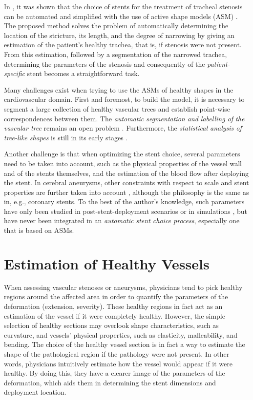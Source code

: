 In \citep{Pinho:Trachea4,Pinho:Thesis}, it was shown that the choice of stents for the treatment of tracheal stenosis can be automated and simplified with the use of active shape models (ASM) \citep{Cootes}. The proposed method solves the problem of automatically determining the location of the stricture, its length, and the degree of narrowing by giving an estimation of the patient's healthy trachea, that is, if stenosis were not present. From this estimation, followed by a segmentation of the narrowed trachea, determining the parameters of the stenosis and consequently of the {\em patient-specific} stent becomes a straightforward task. 

Many challenges exist when trying to use the ASMs of healthy shapes in the cardiovascular domain. First and foremost, to build the model, it is necessary to segment a large collection of healthy vascular trees and establish point-wise correspondences between them. The {\em automatic segmentation and labelling of the vascular tree} remains an open problem \citep{ORKI-08,Antiga,CARR-07,Scherl200721,Bemmel,Dikkers}. Furthermore, the {\em statistical analysis of tree-like shapes} is still in its early stages \citep{Feragen2011,Feragen2012}. 

Another challenge is that when optimizing the stent choice, several parameters need to be taken into account, such as the physical properties of the vessel wall and of the stents themselves, and the estimation of the blood flow after deploying the stent. In cerebral aneurysms, other constraints with respect to scale and stent properties are further taken into account \citep{larrabide:2439,Larrabide2010,bogunovic:210,zhang:1294}, although the philosophy is the same as in, e.g., coronary stents. To the best of the author's knowledge, such parameters have only been studied in post-stent-deployment scenarios or in simulations \citep{deBeule,Florez2,Gori,Vuk,FLOR-07b,Sforza}, but have never been integrated in an {\em automatic stent choice process}, especially one that is based on ASMs. 

\section{Estimation of Healthy Vessels}
\label{sec:healthyvessels}

\challenge
When assessing vascular stenoses or aneurysms, physicians tend to pick healthy regions around the affected area in order to quantify the parameters of the deformation (extension, severity). These healthy regions in fact act as an estimation of the vessel if it were completely healthy. However, the simple selection of healthy sections may overlook shape characteristics, such as curvature, and vessels' physical properties, such as elasticity, malleability, and bending. The choice of the healthy vessel section is in fact a way to estimate the shape of the pathological region if the pathology were not present. In other words, physicians intuitively estimate how the vessel would appear if it were healthy. By doing this, they have a clearer image of the parameters of the deformation, which aids them in determining the stent dimensions and deployment location.

